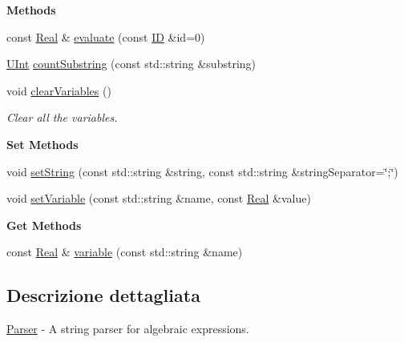 \begin{Indent}{\bf Methods}\par
\begin{DoxyCompactItemize}
\item 
const \hyperlink{namespaceLifeV_ad58c7402b26e5087b634b25d029c9c32}{Real} \& \hyperlink{classLifeV_1_1Parser_a51d84fd4ae6d420620e7beee58fad673}{evaluate} (const \hyperlink{namespaceLifeV_a7c0e64679fcd30daa5471b87a57601e9}{I\-D} \&id=0)
\item 
\hyperlink{namespaceLifeV_a4bd093cf6b0d5b57b2d89e0e90d610b7}{U\-Int} \hyperlink{classLifeV_1_1Parser_a37ae3af9abcf72ca8e1537ec771b523a}{count\-Substring} (const std\-::string \&substring)
\item 
void \hyperlink{classLifeV_1_1Parser_acbc44ff1f0b0074f071ea264a95cb9e7}{clear\-Variables} ()
\begin{DoxyCompactList}\small\item\em Clear all the variables. \end{DoxyCompactList}\end{DoxyCompactItemize}
\end{Indent}
\begin{Indent}{\bf Set Methods}\par
\begin{DoxyCompactItemize}
\item 
void \hyperlink{classLifeV_1_1Parser_ac05769e836a0dc95d9c020df361a5194}{set\-String} (const std\-::string \&string, const std\-::string \&string\-Separator=\char`\"{};\char`\"{})
\item 
void \hyperlink{classLifeV_1_1Parser_aa2b362e12b8feb60231705d499c9fbae}{set\-Variable} (const std\-::string \&name, const \hyperlink{namespaceLifeV_ad58c7402b26e5087b634b25d029c9c32}{Real} \&value)
\end{DoxyCompactItemize}
\end{Indent}
\begin{Indent}{\bf Get Methods}\par
\begin{DoxyCompactItemize}
\item 
const \hyperlink{namespaceLifeV_ad58c7402b26e5087b634b25d029c9c32}{Real} \& \hyperlink{classLifeV_1_1Parser_a9fa902c13c73a3b1bc6db2b5e5c5c93d}{variable} (const std\-::string \&name)
\end{DoxyCompactItemize}
\end{Indent}


\subsection{Descrizione dettagliata}
\hyperlink{classLifeV_1_1Parser}{Parser} -\/ A string parser for algebraic expressions. 

